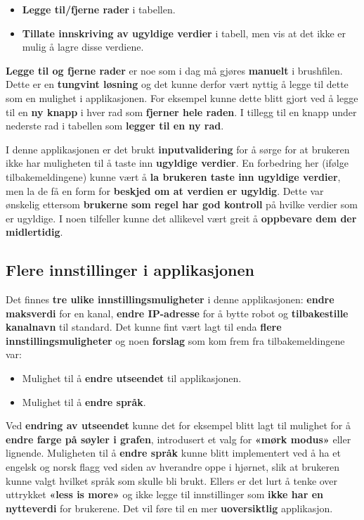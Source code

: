 \begin{itemize}
\item \textbf{Legge til/fjerne rader} i tabellen. 
\item \textbf{Tillate innskriving av ugyldige verdier} i tabell, men vis at det ikke er mulig å lagre disse verdiene.
\end{itemize}

\noindent \textbf{Legge til og fjerne rader} er noe som i dag må gjøres \textbf{manuelt} i brushfilen. Dette er en \textbf{tungvint løsning} og det kunne derfor vært nyttig å legge til dette som en mulighet i applikasjonen. For eksempel kunne dette blitt gjort ved å legge til en \textbf{ny knapp} i hver rad som \textbf{fjerner hele raden}. I tillegg til en knapp under nederste rad i tabellen som \textbf{legger til en ny rad}.

I denne applikasjonen er det brukt \textbf{inputvalidering} for å sørge for at brukeren ikke har muligheten til å taste inn \textbf{ugyldige verdier}. En forbedring her (ifølge tilbakemeldingene) kunne vært å \textbf{la brukeren taste inn ugyldige verdier}, men la de få en form for \textbf{beskjed om at verdien er ugyldig}. Dette var ønskelig ettersom \textbf{brukerne som regel har god kontroll} på hvilke verdier som er ugyldige. I noen tilfeller kunne det allikevel vært greit å \textbf{oppbevare dem der midlertidig}.

\subsection{Flere innstillinger i applikasjonen}
Det finnes \textbf{tre ulike innstillingsmuligheter} i denne applikasjonen: \textbf{endre maksverdi} for en kanal, \textbf{endre IP-adresse} for å bytte robot og \textbf{tilbakestille kanalnavn} til standard. 
Det kunne fint vært lagt til enda \textbf{flere innstillingsmuligheter} og noen \textbf{forslag} som kom frem fra tilbakemeldingene var:

\begin{itemize}
\item Mulighet til å \textbf{endre utseendet} til applikasjonen.
\item Mulighet til å \textbf{endre språk}. 
\end{itemize} 

Ved \textbf{endring av utseendet} kunne det for eksempel blitt lagt til mulighet for å \textbf{endre farge på søyler i grafen}, introdusert et valg for \textbf{«mørk modus»} eller lignende. Muligheten til å \textbf{endre språk} kunne blitt implementert ved å ha et engelsk og norsk flagg ved siden av hverandre oppe i hjørnet, slik at brukeren kunne valgt hvilket språk som skulle bli brukt. Ellers er det lurt å tenke over uttrykket \textbf{ «less is more»} og ikke legge til innstillinger som \textbf{ikke har en nytteverdi} for brukerene. Det vil føre til en mer \textbf{uoversiktlig} applikasjon. 

